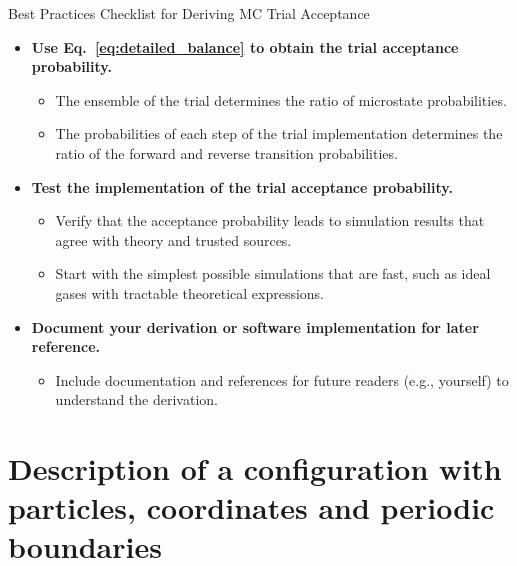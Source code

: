 \documentclass[
  9pt,
  bestpractices,
]{livecoms}
\begin{document}
\begin{Checklists*}[p!]
\begin{checklist}{Best Practices Checklist for Deriving MC Trial Acceptance}
\begin{itemize}
\item
  \textbf{Use Eq.~\ref{eq:detailed_balance} to obtain the trial acceptance probability.}
  \begin{itemize}
    \item The ensemble of the trial determines the ratio of microstate probabilities.
    \item The probabilities of each step of the trial implementation determines the ratio of the forward and reverse transition probabilities.
  \end{itemize}

\item
  \textbf{Test the implementation of the trial acceptance probability.}
  \begin{itemize}
    \item Verify that the acceptance probability leads to simulation results that agree with theory and trusted sources.
    \item Start with the simplest possible simulations that are fast, such as ideal gases with tractable theoretical expressions.
  \end{itemize}

\item
  \textbf{Document your derivation or software implementation for later reference.}
  \begin{itemize}
    \item Include documentation and references for future readers (e.g., yourself) to understand the derivation.
  \end{itemize}

\end{itemize}
\end{checklist}
\end{Checklists*}


\section{\label{sec:configuration}Description of a configuration with particles, coordinates and periodic boundaries}
\end{document}
